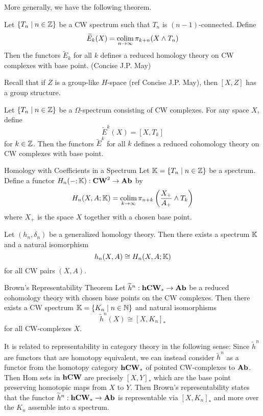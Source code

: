 \documentclass[a4paper]{article}
\begin{document}
More generally, we have the following theorem. 

\begin{thm}{}{} Let $\{T_n\;|\;n\in\mathbb{Z}\}$ be a CW spectrum such that $T_n$ is $(n-1)$-connected. Define $$\widetilde{E}_k(X)=\operatorname*{colim}_{n\to\infty}\pi_{k+n}(X\wedge T_n)$$ Then the functors $\widetilde{E}_k$ for all $k$ defines a reduced homology theory on CW complexes with base point. (Concise J.P. May)
\end{thm}

Recall that if $Z$ is a group-like $H$-space (ref Concise J.P. May), then $[X,Z]$ has a group structure. 

\begin{thm}{}{} Let $\{T_n\;|\;n\in\mathbb{Z}\}$ be a $\Omega$-spectrum consisting of CW complexes. For any space $X$, define $$\widetilde{E}^k(X)=[X,T_k]$$ for $k\in\mathbb{Z}$. Then the functors $\widetilde{E}^k$ for all $k$ defines a reduced cohomology theory on CW complexes with base point. 
\end{thm}

\begin{defn}{Homology with Coefficients in a Spectrum}{} Let $\mathbb{K}=\{T_n\;|\;n\in\mathbb{Z}\}$ be a spectrum. Define a functor $H_n(-;\mathbb{K}):\bold{CW}^2\to\bold{Ab}$ by $$H_n(X,A;\mathbb{K})=\operatorname*{colim}_{k\to\infty}\pi_{n+k}\left(\frac{X_+}{A_+}\wedge T_k\right)$$ where $X_+$ is the space $X$ together with a chosen base point. 
\end{defn}

\begin{thm}{}{} Let $(h_n,\delta_n)$ be a generalized homology theory. Then there exists a spectrum $\mathbb{K}$ and a natural isomorphism $$h_n(X,A)\cong H_n(X,A;\mathbb{K})$$ for all CW pairs $(X,A)$. 
\end{thm}

\begin{thm}{Brown's Representability Theorem}{} Let $\widetilde{h}^n:\bold{hCW}_\ast\to\bold{Ab}$ be a reduced cohomology theory with chosen base points on the CW complexes. Then there exists a CW spectrum $\mathbb{K}=\{K_n\;|\;n\in\mathbb{N}\}$ and natural isomorphisms $$\widetilde{h}^n(X)\cong[X,K_n]_\ast$$ for all CW-complexes $X$. 
\end{thm}

It is related to representability in category theory in the following sense: Since $\widetilde{h}^n$ are functors that are homotopy equivalent, we can instead consider $\widetilde{h}^n$ as a functor from the homotopy category $\bold{hCW}_\ast$ of pointed CW-complexes to $\bold{Ab}$. Then Hom sets in $\bold{hCW}$ are precisely $[X,Y]_\ast$ which are the base point preserving homotopic maps from $X$ to $Y$. Then Brown's representability states that the functor $\widetilde{h}^n:\bold{hCW}_\ast\to\bold{Ab}$ is representable via $[X,K_n]_\ast$ and more over the $K_n$ assemble into a spectrum. \\~\\
\end{document}

